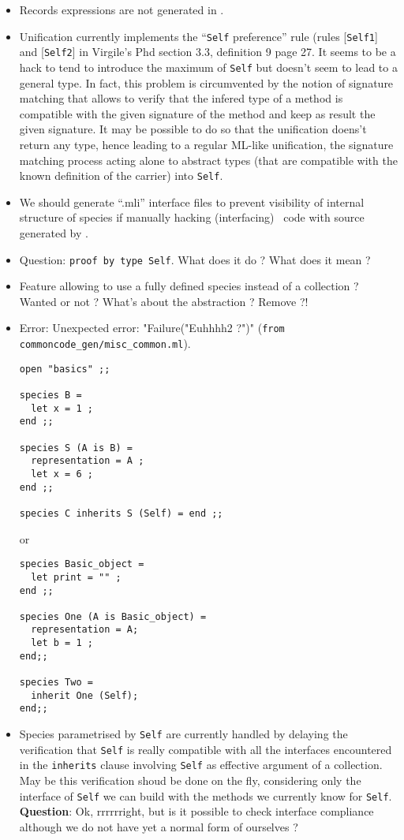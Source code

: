 \begin{itemize}
\item Records expressions are not generated in \coq.

\item Unification currently implements the ``{\tt Self} preference''
  rule (rules [{\tt Self1}] and [{\tt Self2}] in Virgile's Phd section
  3.3, definition 9 page 27. It seems to be a hack to tend to
  introduce the maximum of {\tt Self} but doesn't seem to lead to a
  general type. In fact, this problem is circumvented by the notion of
  signature matching that allows to verify that the infered type of a
  method is compatible with the given signature of the method and keep
  as result the given signature. It may be possible to do so that the
  unification doens't return any type, hence leading to a regular
  ML-like unification, the signature matching process acting alone to
  abstract types (that are compatible with the known definition of the
  carrier) into {\tt Self}.

\item We should generate ``.mli'' interface files to prevent
  visibility of internal structure of species if manually hacking
  (interfacing) \ocaml\ code with source generated by \focalizec.

\item Question: {\tt proof by type Self}. What does it do ? What does
  it mean ?

\item Feature allowing to use a fully defined species instead of a
collection ? Wanted or not ? What's about the abstraction ? Remove ?!

\item Error: Unexpected error: "Failure("Euhhhh2 ?")"
  ({\tt from commoncode\_gen/misc\_common.ml}).
\noindent
{\footnotesize
\begin{lstlisting}
open "basics" ;;

species B =
  let x = 1 ;
end ;;

species S (A is B) =
  representation = A ;
  let x = 6 ;
end ;;

species C inherits S (Self) = end ;;
\end{lstlisting}
}
or
\noindent
{\footnotesize
\begin{lstlisting}
species Basic_object =
  let print = "" ;
end ;;

species One (A is Basic_object) =
  representation = A;
  let b = 1 ;
end;;

species Two =
  inherit One (Self);
end;;
\end{lstlisting}
}
\item Species parametrised by {\tt Self} are currently handled by
  delaying the verification that {\tt Self} is really compatible with
  all the interfaces encountered in the {\tt inherits} clause
  involving {\tt Self} as effective argument of a collection. May be
  this verification shoud be done on the fly, considering only the
  interface of {\tt Self} we can build with the methods we currently
  know for {\tt Self}. {\bf Question}: Ok, rrrrrright, but is it
  possible to check interface compliance although we do not have yet a
  normal form of ourselves ?


\end{itemize}
